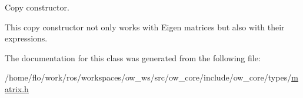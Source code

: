 Copy constructor. 

This copy constructor not only works with Eigen matrices but also with their expressions. 

The documentation for this class was generated from the following file\+:\begin{DoxyCompactItemize}
\item 
/home/flo/work/ros/workspaces/ow\+\_\+ws/src/ow\+\_\+core/include/ow\+\_\+core/types/\hyperlink{matrix_8h}{matrix.\+h}\end{DoxyCompactItemize}
